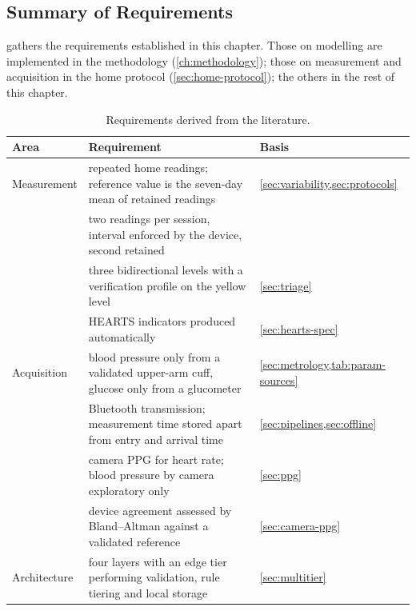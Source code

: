 
\subsection{Summary of Requirements}\label{sec:requirements-summary}\label{sec:spec13}\label{sec:spec21}\label{sec:spec22}\label{sec:spec23}\label{sec:spec24}

 gathers the requirements established in this chapter. Those on modelling are implemented in the methodology (\cref{ch:methodology}); those on measurement and acquisition in the home protocol (\cref{sec:home-protocol}); the others in the rest of this chapter.

\begin{table}[htbp]
\centering\footnotesize
\caption{Requirements derived from the literature.}\label{tab:requirements}
\begin{tabularx}{\textwidth}{@{}>{\raggedright\arraybackslash}p{2.2cm} X >{\raggedright\arraybackslash}p{3.5cm}@{}}
\toprule
\textbf{Area} & \textbf{Requirement} & \textbf{Basis} \\
\midrule
Measurement & repeated home readings; reference value is the seven-day mean of retained readings & \cref{sec:variability,sec:protocols} \\
 & two readings per session, interval enforced by the device, second retained & \textcite{mihevc2025} \\
 & three bidirectional levels with a verification profile on the yellow level & \cref{sec:triage} \\
 & HEARTS indicators produced automatically & \cref{sec:hearts-spec} \\
\addlinespace
Acquisition & blood pressure only from a validated upper-arm cuff, glucose only from a glucometer & \cref{sec:metrology,tab:param-sources} \\
 & Bluetooth transmission; measurement time stored apart from entry and arrival time & \cref{sec:pipelines,sec:offline} \\
 & camera PPG for heart rate; blood pressure by camera exploratory only & \cref{sec:ppg} \\
 & device agreement assessed by Bland--Altman against a validated reference & \cref{sec:camera-ppg} \\
\addlinespace
Architecture & four layers with an edge tier performing validation, rule tiering and local storage & \cref{sec:multitier} \\

\end{tabularx}
\end{table}
